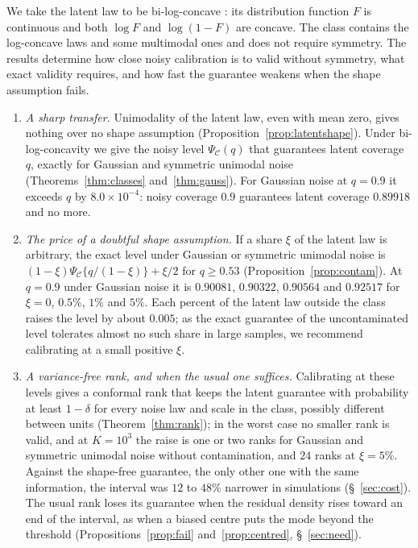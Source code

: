 \documentclass[12pt]{article}
\theoremstyle{definition}
\newcommand{\E}{\mathcal{C}}
\begin{document}
We take the latent law to be bi-log-concave \citep*{dumbgen2017}: its distribution function $F$ is continuous and both $\log F$ and $\log(1 - F)$ are concave. The class contains the log-concave laws and some multimodal ones and does not require symmetry. The results determine how close noisy calibration is to valid without symmetry, what exact validity requires, and how fast the guarantee weakens when the shape assumption fails.
\begin{enumerate}
\item \emph{A sharp transfer.} Unimodality of the latent law, even with mean zero, gives nothing over no shape assumption (Proposition~\ref{prop:latentshape}). Under bi-log-concavity we give the noisy level $\Psi_{\E}(q)$ that guarantees latent coverage $q$, exactly for Gaussian and symmetric unimodal noise (Theorems~\ref{thm:classes} and~\ref{thm:gauss}). For Gaussian noise at $q = 0.9$ it exceeds $q$ by $8.0 \times 10^{-4}$: noisy coverage $0.9$ guarantees latent coverage $0.89918$ and no more.
\item \emph{The price of a doubtful shape assumption.} If a share $\xi$ of the latent law is arbitrary, the exact level under Gaussian or symmetric unimodal noise is $(1 - \xi)\Psi_{\E}\{q/(1 - \xi)\} + \xi/2$ for $q \ge 0.53$ (Proposition~\ref{prop:contam}). At $q = 0.9$ under Gaussian noise it is $0.90081$, $0.90322$, $0.90564$ and $0.92517$ for $\xi = 0$, $0.5\%$, $1\%$ and $5\%$. Each percent of the latent law outside the class raises the level by about $0.005$; as the exact guarantee of the uncontaminated level tolerates almost no such share in large samples, we recommend calibrating at a small positive $\xi$.
\item \emph{A variance-free rank, and when the usual one suffices.} Calibrating at these levels gives a conformal rank that keeps the latent guarantee with probability at least $1 - \delta$ for every noise law and scale in the class, possibly different between units (Theorem~\ref{thm:rank}); in the worst case no smaller rank is valid, and at $K = 10^3$ the raise is one or two ranks for Gaussian and symmetric unimodal noise without contamination, and $24$ ranks at $\xi = 5\%$. Against the shape-free guarantee, the only other one with the same information, the interval was $12$ to $48\%$ narrower in simulations (\S~\ref{sec:cost}). The usual rank loses its guarantee when the residual density rises toward an end of the interval, as when a biased centre puts the mode beyond the threshold (Propositions~\ref{prop:fail} and~\ref{prop:centred}, \S~\ref{sec:need}).
\end{enumerate}
\end{document}
